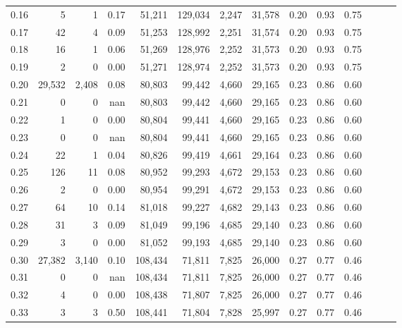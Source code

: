 \begin{tabular}{rrrrrrrrrrrrrr}
0.16 &       5 &      1 &  0.17 &   51,211 &  129,034 &   2,247 &  31,578 &  0.20 &  0.93 &      0.75 \\
0.17 &      42 &      4 &  0.09 &   51,253 &  128,992 &   2,251 &  31,574 &  0.20 &  0.93 &      0.75 \\
0.18 &      16 &      1 &  0.06 &   51,269 &  128,976 &   2,252 &  31,573 &  0.20 &  0.93 &      0.75 \\
0.19 &       2 &      0 &  0.00 &   51,271 &  128,974 &   2,252 &  31,573 &  0.20 &  0.93 &      0.75 \\
0.20 &  29,532 &  2,408 &  0.08 &   80,803 &   99,442 &   4,660 &  29,165 &  0.23 &  0.86 &      0.60 \\
0.21 &       0 &      0 &   nan &   80,803 &   99,442 &   4,660 &  29,165 &  0.23 &  0.86 &      0.60 \\
0.22 &       1 &      0 &  0.00 &   80,804 &   99,441 &   4,660 &  29,165 &  0.23 &  0.86 &      0.60 \\
0.23 &       0 &      0 &   nan &   80,804 &   99,441 &   4,660 &  29,165 &  0.23 &  0.86 &      0.60 \\
0.24 &      22 &      1 &  0.04 &   80,826 &   99,419 &   4,661 &  29,164 &  0.23 &  0.86 &      0.60 \\
0.25 &     126 &     11 &  0.08 &   80,952 &   99,293 &   4,672 &  29,153 &  0.23 &  0.86 &      0.60 \\
0.26 &       2 &      0 &  0.00 &   80,954 &   99,291 &   4,672 &  29,153 &  0.23 &  0.86 &      0.60 \\
0.27 &      64 &     10 &  0.14 &   81,018 &   99,227 &   4,682 &  29,143 &  0.23 &  0.86 &      0.60 \\
0.28 &      31 &      3 &  0.09 &   81,049 &   99,196 &   4,685 &  29,140 &  0.23 &  0.86 &      0.60 \\
0.29 &       3 &      0 &  0.00 &   81,052 &   99,193 &   4,685 &  29,140 &  0.23 &  0.86 &      0.60 \\
0.30 &  27,382 &  3,140 &  0.10 &  108,434 &   71,811 &   7,825 &  26,000 &  0.27 &  0.77 &      0.46 \\
0.31 &       0 &      0 &   nan &  108,434 &   71,811 &   7,825 &  26,000 &  0.27 &  0.77 &      0.46 \\
0.32 &       4 &      0 &  0.00 &  108,438 &   71,807 &   7,825 &  26,000 &  0.27 &  0.77 &      0.46 \\
0.33 &       3 &      3 &  0.50 &  108,441 &   71,804 &   7,828 &  25,997 &  0.27 &  0.77 &      0.46 \\

\end{tabular}
